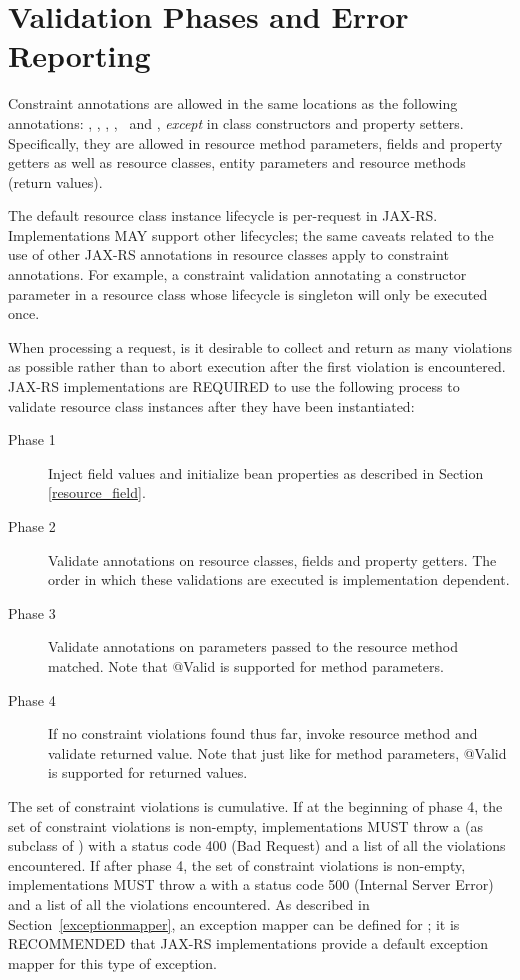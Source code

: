 \section{Validation Phases and Error Reporting}
\label{validation_phases_and_error_reporting}

Constraint annotations are allowed in the same locations as the following annotations: \MatrixParam, \QueryParam, \PathParam, \CookieParam, \HeaderParam\ and \Context, {\em except} in class constructors and property setters. Specifically, they are allowed in resource method parameters, fields and property getters as well as resource classes, entity parameters and resource methods (return values). 

The default resource class instance lifecycle is per-request in JAX-RS. Implementations MAY support other lifecycles; the same caveats related to the use of other JAX-RS annotations in resource classes apply to constraint annotations. For example, a constraint validation annotating a constructor parameter in a resource class whose lifecycle is singleton will only be executed once.

When processing a request, is it desirable to collect and return as many violations as possible rather than to abort execution after the first violation is encountered. JAX-RS implementations are REQUIRED to use the following process to validate resource class instances after they have been instantiated:

\begin{description}
\item[Phase 1] Inject field values and initialize bean properties as described in Section \ref{resource_field}.
\item[Phase 2] Validate annotations on resource classes, fields and property getters. The order in which these validations are executed is implementation dependent.
\item[Phase 3] Validate annotations on parameters passed to the resource method matched. Note that @Valid is supported for method parameters.
\item[Phase 4] If no constraint violations found thus far, invoke resource method and validate returned value. Note that just like for method parameters, @Valid is supported for returned values.
\end{description}

The set of constraint violations is cumulative. If at the beginning of phase 4, the set of constraint violations is non-empty, implementations MUST throw a  (as subclass of \WebAppExc) with a status code 400 (Bad Request) and a list of all the violations encountered. If after phase 4, the set of constraint violations is non-empty, implementations MUST throw a  with a status code 500 (Internal Server Error) and a list of all the violations encountered. As described in Section~\ref{exceptionmapper}, an exception mapper can be defined for ; it is RECOMMENDED that JAX-RS implementations provide a default exception mapper for this type of exception.

